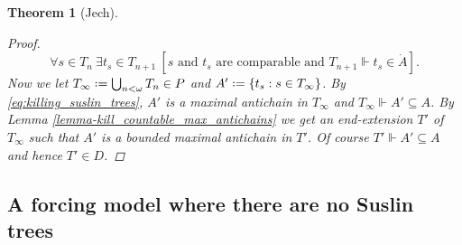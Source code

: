 \documentclass[11pt,a4paper]{report}
\newtheorem{theorem}{Theorem}[chapter] %
\theoremstyle{definition}
\theoremstyle{num.custom-title}
\theoremstyle{custom-title}
\DeclareMathOperator{\sse}{\subseteq}
\newcommand*{\defeq}{\mathrel{\rlap{%
                     \raisebox{0.3ex}{$\cdot$}}%
                     \raisebox{-0.3ex}{$\cdot$}}%
                     =}
\newcommand{\forces}{\Vdash}
\begin{document}
\begin{theorem}[Jech]
\begin{proof}
\begin{equation}\label{eq:killing_suslin_trees}
\forall s \in T_n \ \exists t_s \in T_{n+1} \ [\text{$s$ and $t_s$ are comparable and $T_{n+1} \forces t_s \in \dot{A}$}].
\end{equation}
Now we let $T_\infty \defeq \bigcup_{n < \omega} T_n \in P$ and $A' \defeq \{t_s : s \in T_\infty\}$. By \eqref{eq:killing_suslin_trees}, $A'$ is a maximal antichain in $T_\infty$ and $T_\infty \forces A' \sse A$. By Lemma \ref{lemma-kill_countable_max_antichains} we get an end-extension $T'$ of $T_\infty$ such that $A'$ is a bounded maximal antichain in $T'$. Of course $T' \forces A' \sse A$ and hence $T' \in D$.
\end{proof}
\end{theorem}


\subsection{A forcing model where there are no Suslin trees}
\end{document}
